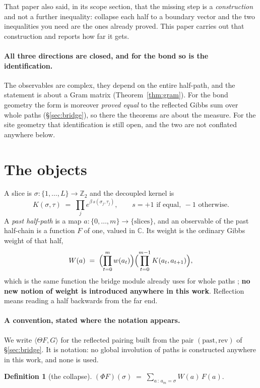 \documentclass[11pt]{article}
\theoremstyle{definition}
\newtheorem{definition}[theorem]{Definition}
\newcommand{\C}{\mathbb{C}}
\newcommand{\Z}{\mathbb{Z}}
\begin{document}
That paper also said, in its scope section, that the missing step is a
\emph{construction} and not a further inequality: collapse each half to a
boundary vector and the two inequalities you need are the ones already proved.
This paper carries out that construction and reports how far it gets.

\paragraph{All three directions are closed, and for the bond so is the
identification.}  The observables are complex, they depend on the entire
half-path, and the statement is about a Gram matrix
(Theorem~\ref{thm:gram}).  For the bond geometry the form is moreover
\emph{proved equal} to the reflected Gibbs sum over whole paths
(\S\ref{sec:bridge}), so there the theorems are about the measure.  For the site
geometry that identification is still open, and the two are not conflated
anywhere below.

\section{The objects}\label{sec:objects}

A slice is $\sigma:\{1,\dots,L\}\to\Z_2$ and the decoupled kernel is
\[
  K(\sigma,\tau)\;=\;\prod_{j} e^{\beta\, s(\sigma_j,\tau_j)},
  \qquad s=+1 \text{ if equal},\ -1 \text{ otherwise}.
\]
A \emph{past half-path} is a map $a:\{0,\dots,m\}\to\{\text{slices}\}$, and an
observable of the past half-chain is a function $F$ of one, valued in $\C$.  Its
weight is the ordinary Gibbs weight of that half,
\[
  W(a)\;=\;\Bigl(\prod_{t=0}^{m} w(a_t)\Bigr)
           \Bigl(\prod_{t=0}^{m-1} K(a_t,a_{t+1})\Bigr),
\]
which is the same function the bridge module already uses for whole paths
\cite{ErikssonGibbs}; \textbf{no new notion of weight is introduced anywhere in
this work}.  Reflection means reading a half backwards from the far end.

\paragraph{A convention, stated where the notation appears.}  We write
$\langle\Theta F,G\rangle$ for the reflected pairing built from the pair
$(\mathrm{past},\mathrm{rev})$ of \S\ref{sec:bridge}.  It is notation: no global
involution of paths is constructed anywhere in this work, and none is used.

\begin{definition}[the collapse]\label{def:collapse}
$\displaystyle (\Phi F)(\sigma)\;=\;\sum_{a\,:\,a_m=\sigma} W(a)\,F(a).$
\end{definition}
\end{document}
